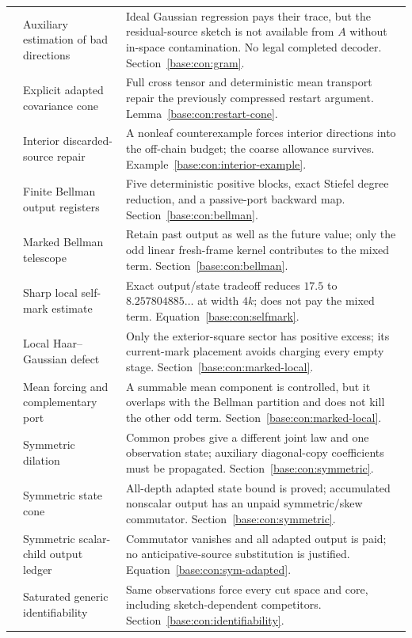 \documentclass[11pt,oneside,openany,a4paper]{book}
\numberwithin{equation}{chapter}
\theoremstyle{definition}
\theoremstyle{remark}
\begin{document}
\begin{longtable}{@{}>{\RaggedRight\arraybackslash}p{.06\linewidth}>{\RaggedRight\arraybackslash}p{.29\linewidth}>{\RaggedRight\arraybackslash}p{.57\linewidth}@{}}
44&Auxiliary estimation of bad directions&Ideal Gaussian regression pays their trace, but the residual-source sketch is not available from $A$ without in-space contamination. No legal completed decoder. Section~\ref{base:con:gram}.\\
45&Explicit adapted covariance cone&Full cross tensor and deterministic mean transport repair the previously compressed restart argument. Lemma~\ref{base:con:restart-cone}.\\
46&Interior discarded-source repair&A nonleaf counterexample forces interior directions into the off-chain budget; the coarse allowance survives. Example~\ref{base:con:interior-example}.\\
47&Finite Bellman output registers&Five deterministic positive blocks, exact Stiefel degree reduction, and a passive-port backward map. Section~\ref{base:con:bellman}.\\
48&Marked Bellman telescope&Retain past output as well as the future value; only the odd linear fresh-frame kernel contributes to the mixed term. Section~\ref{base:con:bellman}.\\
49&Sharp local self-mark estimate&Exact output/state tradeoff reduces $17.5$ to $8.257804885\ldots$ at width $4k$; does not pay the mixed term. Equation~\eqref{base:con:selfmark}.\\
50&Local Haar--Gaussian defect&Only the exterior-square sector has positive excess; its current-mark placement avoids charging every empty stage. Section~\ref{base:con:marked-local}.\\
51&Mean forcing and complementary port&A summable mean component is controlled, but it overlaps with the Bellman partition and does not kill the other odd term. Section~\ref{base:con:marked-local}.\\
52&Symmetric dilation&Common probes give a different joint law and one observation state; auxiliary diagonal-copy coefficients must be propagated. Section~\ref{base:con:symmetric}.\\
53&Symmetric state cone&All-depth adapted state bound is proved; accumulated nonscalar output has an unpaid symmetric/skew commutator. Section~\ref{base:con:symmetric}.\\
54&Symmetric scalar-child output ledger&Commutator vanishes and all adapted output is paid; no anticipative-source substitution is justified. Equation~\eqref{base:con:sym-adapted}.\\
55&Saturated generic identifiability&Same observations force every cut space and core, including sketch-dependent competitors. Section~\ref{base:con:identifiability}.\\

\end{longtable}
\end{document}
